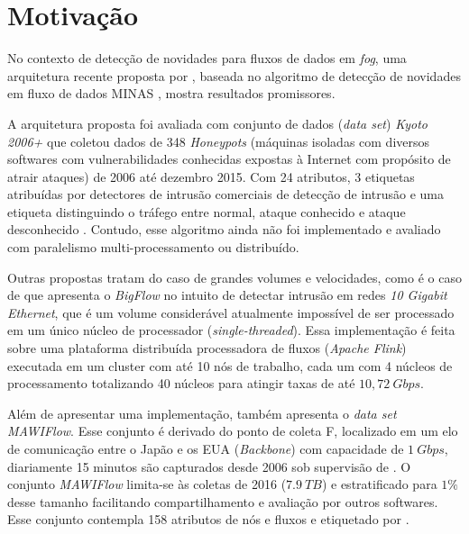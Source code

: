 \section{Motivação}

No contexto de detecção de novidades para fluxos de dados em \emph{fog}, uma
arquitetura recente proposta por , baseada no algoritmo
de detecção de novidades em fluxo de dados MINAS
\cite{Faria2016minas}, mostra resultados promissores.

A arquitetura proposta foi avaliada com conjunto de dados (\emph{data set}) \emph{Kyoto 2006+} que
coletou dados de 348 \emph{Honeypots} (máquinas isoladas com diversos softwares
com vulnerabilidades conhecidas expostas à Internet com propósito de atrair
ataques) de 2006 até dezembro 2015. Com 24 atributos, 3 etiquetas atribuídas por
detectores de intrusão comerciais de detecção de intrusão e uma etiqueta
distinguindo o tráfego entre normal, ataque conhecido e ataque desconhecido
\cite{Cassales2019a}.
Contudo, esse algoritmo ainda não foi implementado e avaliado com paralelismo
multi-processamento ou distribuído.

Outras propostas tratam do caso de grandes volumes e velocidades, como é o caso
de  que apresenta o \emph{BigFlow} no intuito de detectar
intrusão em redes \emph{10 Gigabit Ethernet}, que é um volume considerável
atualmente impossível de ser processado em um único núcleo de processador
(\emph{single-threaded}). Essa implementação é feita sobre uma plataforma
distribuída processadora de fluxos (\emph{Apache Flink}) executada em um cluster
com até 10 nós de trabalho, cada um com 4 núcleos de processamento totalizando
40 núcleos para atingir taxas de até $10,72 \ Gbps$.

Além de apresentar uma implementação,  também apresenta o
\emph{data set} \emph{MAWIFlow}. Esse conjunto é derivado do ponto de coleta
F, localizado em um elo de comunicação entre o Japão e os EUA (\emph{Backbone})
com capacidade de $1\ Gbps$, diariamente 15 minutos são capturados desde 2006
sob supervisão de  \cite{Fontugne2010}. O conjunto
\emph{MAWIFlow} limita-se às coletas de 2016 ($7.9\ TB$) e estratificado para
$1\%$ desse tamanho facilitando compartilhamento e avaliação por outros
softwares. Esse conjunto contempla 158 atributos de nós e fluxos e etiquetado
por .


